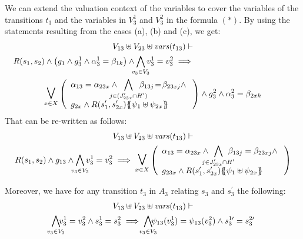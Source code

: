 \documentclass[runningheads]{llncs}
\begin{document}
\begin{enumerate}
We can extend the valuation context of the variables to cover the variables of the transitions $t_3$ and the variables in $V_3^1$ and $V_3^2$ in the formula $(*)$.  
By   using the statements resulting from the cases (a), (b) and (c), we get:
\begin{multline*}
V_{13} \uplus V_{23}  \uplus \fvars{t_{13}} \vdash\\
R\mpar{s_1, s_{2}} \wedge \mpar{g_1 \wedge g^1_3 \wedge \alpha^1_3=\beta_{1k}}\wedge \bigwedge_\subbox{v_3\in V_3}  v^1_3=v^2_3 %
\implies  \hspace{12em}\\
\operatorname*{\bigsymb{\bigvee}}_{x \in X} \mpar{\everymath{\displaystyle}
\begin{array}{l}
			\alpha_{13} = \alpha_{23x} \wedge \bigwedge_\subbox{j \in (J'_{23x} \cap H')} \beta_{13j}\! =\! \beta_{23xj}\nwedge\\
			  g_{2x} \wedge R\mpar{s'_1, s'_{2x}}\psubst{\psi_1 \uplus \psi_{2x}}
		\end{array}}  \wedge g^2_3 \wedge \alpha^2_3=\beta_{2xk} 
\end{multline*}	
That can be re-written as follows:
\begin{multline*}
V_{13} \uplus V_{23} \uplus \fvars{t_{13}}  \vdash\\
R\mpar{s_1, s_{2}} \wedge g_{13}  \land \bigwedge_\subbox{v_3\in V_3} v^1_3=v^2_3
\implies  \operatorname*{\bigsymb{\bigvee}}_{x \in X} \mpar{\everymath{\displaystyle}
\begin{array}{l}
			\alpha_{13} = \alpha_{23x} \wedge \bigwedge_\subbox{j \in J'_{23x} \cap H'} \beta_{13j} = \beta_{23xj} \nwedge\\
			g_{23x} \wedge R\mpar{s'_1, s'_{2x}}\psubst{\psi_1 \uplus \psi_{2x}}
		\end{array}}   
\end{multline*}	

Moreover, we have  for any transition $t_3$ in $A_3$ relating $s_3$ and $s^{\prime}_3$ the following:
\begin{multline*}
V_{13} \uplus V_{23}  \uplus \fvars{t_{13}} \vdash\\
\bigwedge_\subbox{v_3\in V_3}\!\! v^1_3=v^2_3  \wedge s^1_3 = s^2_3 \implies \bigwedge_\subbox{v_3\in V_3}\!\! \psi_{13}(v^1_3)=\psi_{13}(v^2_3)  \wedge s^{1\prime}_3 = s^{2\prime}_3 
\end{multline*}


\end{enumerate}
\end{document}
